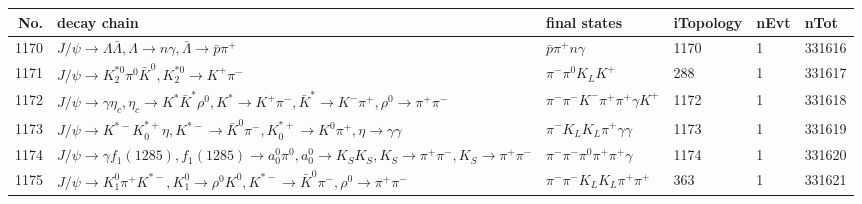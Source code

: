 \begin{table}[htbp] 
\begin{center}
\begin{small}
\begin{tabular}{rlllll}\hline\hline
 No. & decay chain & final states &  iTopology & nEvt & nTot \\\hline
1170&$J/\psi       \rightarrow \Lambda           \bar{\Lambda}    , \Lambda            \rightarrow n                 \gamma       , \bar{\Lambda}     \rightarrow \bar{p}          \pi^{+}        $&$\bar{p}          \pi^{+}        n                 \gamma       $& 1170&    1&331616\\
1171&$J/\psi       \rightarrow K_2^{*0}       \pi^{0}        \bar{K}^{0}   , K_2^{*0}        \rightarrow K^{+}          \pi^{-}        $&$\pi^{-}        \pi^{0}        K_{L}          K^{+}          $&  288&    1&331617\\
1172&$J/\psi       \rightarrow \gamma       \eta_{c}    , \eta_{c}     \rightarrow K^{*}          \bar{K}^{*}   \rho^{0}      , K^{*}           \rightarrow K^{+}          \pi^{-}        , \bar{K}^{*}    \rightarrow K^{-}          \pi^{+}        , \rho^{0}       \rightarrow \pi^{+}        \pi^{-}        $&$\pi^{-}        \pi^{-}        K^{-}          \pi^{+}        \pi^{+}        \gamma       K^{+}          $& 1172&    1&331618\\
1173&$J/\psi       \rightarrow K^{*-}         K_{0}^{*+}     \eta          , K^{*-}          \rightarrow \bar{K}^{0}   \pi^{-}        , K_{0}^{*+}      \rightarrow K^{0}          \pi^{+}        , \eta           \rightarrow \gamma       \gamma       $&$\pi^{-}        K_{L}          K_{L}          \pi^{+}        \gamma       \gamma       $& 1173&    1&331619\\
1174&$J/\psi       \rightarrow \gamma       f_{1}(1285)    , f_{1}(1285)     \rightarrow a_{0}^{0}      \pi^{0}        , a_{0}^{0}       \rightarrow K_{S}          K_{S}          , K_{S}           \rightarrow \pi^{+}        \pi^{-}        , K_{S}           \rightarrow \pi^{+}        \pi^{-}        $&$\pi^{-}        \pi^{-}        \pi^{0}        \pi^{+}        \pi^{+}        \gamma       $& 1174&    1&331620\\
1175&$J/\psi       \rightarrow K_1^{0}        \pi^{+}        K^{*-}         , K_1^{0}         \rightarrow \rho^{0}      K^{0}          , K^{*-}          \rightarrow \bar{K}^{0}   \pi^{-}        , \rho^{0}       \rightarrow \pi^{+}        \pi^{-}        $&$\pi^{-}        \pi^{-}        K_{L}          K_{L}          \pi^{+}        \pi^{+}        $&  363&    1&331621\\

\end{tabular}
\end{small}
\end{center}
\end{table}
